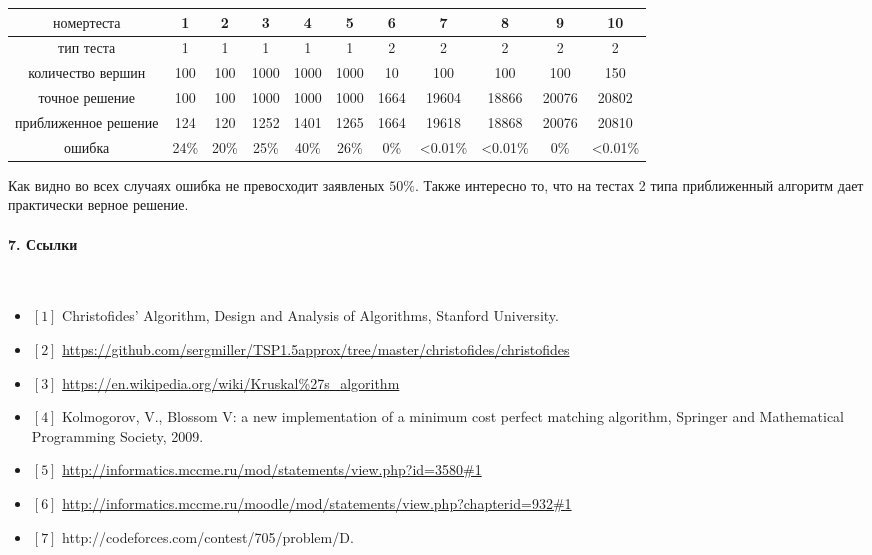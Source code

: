 \documentclass[14pt]{article}
\begin{document}
             \begin{center}
                    \begin{tabular}{|c|c|c|c|c|c|c|c|c|c|c|}
                            \hline 
                                $номер теста$ & 1 & 2 & 3 & 4 & 5 & 6 & 7 & 8 & 9 & 10 \\
                            \hline
                                тип теста &1 &1 &1 &1 &1 &2 &2 &2 &2 &2 \\
                            \hline
                                количество вершин &100 &100 &1000 &1000 &1000 &10 &100 &100 &100 &150 \\  
                            \hline 
                                точное решение &100 &100 &1000 &1000 &1000 &1664 &19604 &18866 &20076 &20802 \\
                            \hline
                                приближенное решение &124 &120 &1252 &1401 &1265 &1664 &19618 &18868 &20076 &20810 \\
                            \hline
                                ошибка &24\% &20\% &25\% &40\% &26\% &0\% &<0.01\% &<0.01\% &0\% &<0.01\%  \\
                    \end{tabular}
        \end{center}

        Как видно во всех случаях ошибка не превосходит заявленых $50\%$. Также интересно то, что на тестах 2 типа приближенный алгоритм дает практически верное решение.

        \paragraph{\large{7. Ссылки}}\mbox{}\\
        \begin{itemize}
        \item $[1]$ Christofides' Algorithm, Design and Analysis of Algorithms, Stanford University.

        \item $[2]$ \url{https://github.com/sergmiller/TSP1.5approx/tree/master/christofides/christofides}

        \item $[3]$ \url{https://en.wikipedia.org/wiki/Kruskal%27s_algorithm}

        \item $[4]$ Kolmogorov, V., Blossom V: a new implementation of a minimum cost perfect matching algorithm, Springer and Mathematical Programming Society, 2009.

        \item $[5]$ \url{http://informatics.mccme.ru/mod/statements/view.php?id=3580#1}

        \item $[6]$ \url{http://informatics.mccme.ru/moodle/mod/statements/view.php?chapterid=932#1}

        \item $[7]$ http://codeforces.com/contest/705/problem/D. 
        
        \end{itemize}
\end{document}
